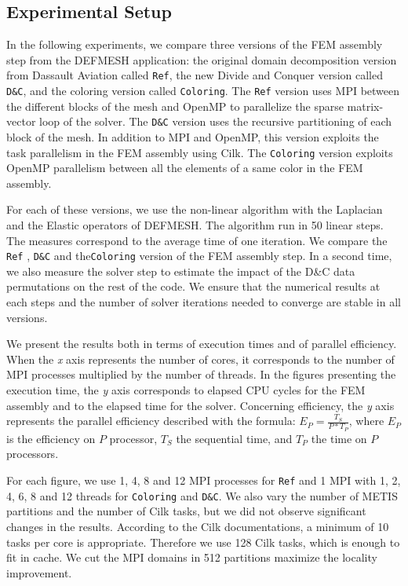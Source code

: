 \documentclass[10pt]{IOS-Book-Article}
\begin{document}
\subsection{Experimental Setup}
In the following experiments, we compare three versions of the FEM assembly step from the DEFMESH application:
the original domain decomposition version from Dassault Aviation called {\tt Ref}, the new Divide and Conquer version called {\tt D\&C}, and the coloring version called {\tt Coloring}.
The {\tt Ref} version uses MPI between the different blocks of the mesh and OpenMP to parallelize the sparse matrix-vector loop of the solver.
The {\tt D\&C} version uses the recursive partitioning of each block of the mesh.
In addition to MPI and OpenMP, this version exploits the task parallelism in the FEM assembly using Cilk.
The {\tt Coloring} version exploits OpenMP parallelism between all the elements of a same color in the FEM assembly.

For each of these versions, we use the non-linear algorithm with the Laplacian and the Elastic operators of DEFMESH.
The algorithm run in 50 linear steps.
The measures correspond to the average time of one iteration.
We compare the  {\tt Ref} , {\tt D\&C} and the{\tt Coloring} version of the FEM assembly step.
In a second time, we also measure the solver step to estimate the impact of the D\&C data permutations on the rest of the code.
We ensure that the numerical results at each steps and the number of solver iterations needed to converge are stable in all versions.

We present the results both in terms of execution times and of parallel efficiency.
When the \emph{x} axis represents the number of cores, it corresponds to the number of MPI processes multiplied by the number of threads.
In the figures presenting the execution time, the \emph{y} axis corresponds to elapsed CPU cycles for the FEM assembly and to the elapsed time for the solver.
Concerning efficiency, the \emph{y} axis represents the parallel efficiency described with the formula:
$E_{P} = \frac{T_{S}}{P*T_{P}}$, where $E_{P}$ is the efficiency on $P$ processor, $T_{S}$ the sequential time, and $T_{P}$ the time on $P$ processors.

For each figure, we use 1, 4, 8 and 12 MPI processes for {\tt Ref} and 1 MPI with 1, 2, 4, 6, 8 and 12 threads for {\tt Coloring} and {\tt D\&C}.
We also vary the number of METIS partitions and the number of Cilk tasks, but we did not observe significant changes in the results.
According to the Cilk documentations, a minimum of 10 tasks per core is appropriate.
Therefore we use 128 Cilk tasks, which is enough to fit in cache.
We cut the MPI domains in 512 partitions maximize the locality improvement.
\end{document}
